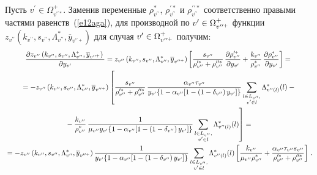    Пусть $v^\prime\in\Omega^+_{v^{\prime\prime *}}$. Заменив переменные 
$\rho^*_{ v^{\prime\prime}}$, $\rho^{\prime *}_{ v^{\prime\prime}}$ и
$\rho^{\prime\prime *}_{ v^{\prime\prime}}$ соответственно правыми 
частями равенств~(\ref{e12aga}), для производной по 
$v^\prime\hm\in \Omega^+_{v^{\prime\prime +}}$ функции 
   $z_{ v^{\prime\prime}} \left(k_{ v^{\prime\prime}}, s_{ v^{\prime\prime}}, 
\Lambda^*_{ v^{\prime\prime}}, \overline{y}_{ v^{\prime\prime +}}\right)$ для 
случая $v^\prime\hm\in \Omega^+_{v^{\prime\prime +}}$ получим:
   \begin{multline}
   \fr{\partial z_{ v^{\prime\prime}}\left(k_{ v^{\prime\prime}}, 
   s_{v^{\prime\prime}}, 
   \Lambda^*_{ v^{\prime\prime}}, \overline{y}_{ v^{\prime\prime 
+}}\right)}{\partial y_{v^\prime}}= %
z_{v^{\prime\prime}}\left( k_{ v^{\prime\prime}}, s_{ v^{\prime\prime}}, 
\Lambda^*_{ v^{\prime\prime}}, \overline{y}_{ v^{\prime\prime +}}\right)
   \left[ \fr{s_{ v^{\prime\prime}}}{\rho_{ v^{\prime\prime}}^{\prime 
*}+\rho_{ v^{\prime\prime}}^{\prime\prime *}}\,
   \fr{\partial \rho_{ v^{\prime\prime}}^{\prime *}}{\partial y_{v^\prime}}+
   \fr{k_{ v^{\prime\prime}}}{\rho^*_{ v^{\prime\prime}}}\,
   \fr{\partial \rho^*_{ v^{\prime\prime}}}{\partial y_{v^\prime}}\right]={}\\
   {}= -z_{ v^{\prime\prime}}\left(k_{ v^{\prime\prime}}, s_{ v^{\prime\prime}}, 
\Lambda^*_{ v^{\prime\prime}}, \overline{y}_{ v^{\prime\prime +}}\right)\left[
\vphantom{   \sum\limits_{\substack{{l\in L_{ v^{\prime\prime}},}\\ {v^\prime\in l}}} }
   \fr{s_{ v^{\prime\prime}}}{\rho_{ v^{\prime\prime}}^{\prime *}+\rho_{ 
v^{\prime\prime}}^{\prime\prime *}}\,
   \fr{\alpha_{ v^{\prime\prime}}\tau_{ v^{\prime\prime}}}
   {y_{v^\prime}\{ 1-\alpha_{ v^{\prime\prime}}[1-\left(1-\delta_{ 
v^{\prime\prime}}\right)y_{v^\prime}]\}}
\sum\limits_{\substack{{l\in L_{v^{\prime\prime}},}\\{v^\prime \in l}}}
\Lambda^*_{v^{\prime\prime}(l)}(l)-{}\right.\\
\left.   {}- \fr{k_{ v^{\prime\prime}}}{\rho^*_{ v^{\prime\prime}}}\,
   \fr{1}{\mu_{ v^{\prime\prime}} y_{v^\prime}\{1-\alpha_{ 
v^{\prime\prime}}[1-\left(1-\delta_{ v^{\prime\prime}}\right)y_{v^\prime}]\}}
   \sum\limits_{\substack{{l\in L_{ v^{\prime\prime}},}\\ {v^\prime\in l}}} 
\Lambda^*_{v^{\prime\prime}(l)}(l)\right]={}\\
   {}= -z_{v^{\prime\prime}}\left(k_{ v^{\prime\prime}}, s_{ v^{\prime\prime}}, 
\Lambda^*_{ v^{\prime\prime}}, \overline{y}_{ v^{\prime\prime +}}\right)
   \fr{1}{y_{v^\prime}\{ 1-\alpha_{ v^{\prime\prime}}[1-\left(1-\delta_{ 
v^{\prime\prime}}\right)y_{v^\prime}]\}} 
   \sum\limits_{\substack{{l\in L_{ v^{\prime\prime}},}\\ {v^\prime\in l}}}
   \Lambda^*_{v^{\prime\prime}(l)}(l)\left[
   \fr{k_{ v^{\prime\prime}}}{\mu_{ v^{\prime\prime}} 
   \rho_{v^{\prime\prime}}^*}+\fr{\alpha_{ v^{\prime\prime}}\tau_{ v^{\prime\prime}} 
s_{ v^{\prime\prime}}}{\rho_{ v^{\prime\prime}}^{\prime *}+
\rho_{ v^{\prime\prime}}^{\prime\prime *}}\right]\,.
\label{e15aga}
   \end{multline}
   
